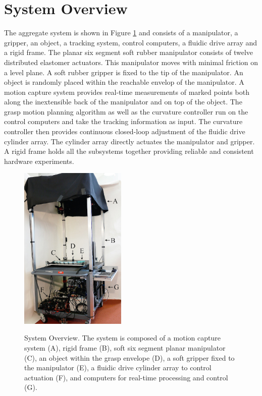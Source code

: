 \section{System Overview}
\label{sec:System_Overview}
The aggregate system is shown in Figure \ref{fig:sys_overview} and consists of a manipulator, a gripper, an object, a tracking system, control computers, a fluidic drive array and a rigid frame.
The planar six segment soft rubber manipulator consists of twelve distributed elastomer actuators. This manipulator moves with minimal friction on a level plane.
A soft rubber gripper is fixed to the tip of the manipulator.
An object is randomly placed within the reachable envelop of the manipulator. 
A motion capture system provides real-time measurements of marked points both along the inextensible back of the manipulator and on top of the object. 
The grasp motion planning algorithm as well as the curvature controller run on the control computers and take the tracking information as input.
The curvature controller then provides continuous closed-loop adjustment of the fluidic drive cylinder array.
The cylinder array directly actuates the manipulator and gripper.
A rigid frame holds all the subsystems together providing reliable and consistent hardware experiments.

\begin{figure}[htbp]
\begin{centering}
  \includegraphics[width=2.0in]{Figures/system_overview/sys_overview_smaller}\\
  \caption{System Overview. The system is composed of a motion capture system (A), rigid frame (B), soft six segment planar manipulator (C), an object within the grasp envelope (D), a soft gripper fixed to the manipulator (E), a fluidic drive cylinder array to control actuation (F), and computers for real-time processing and control (G).} \label{fig:sys_overview}
\end{centering}
\end{figure}
